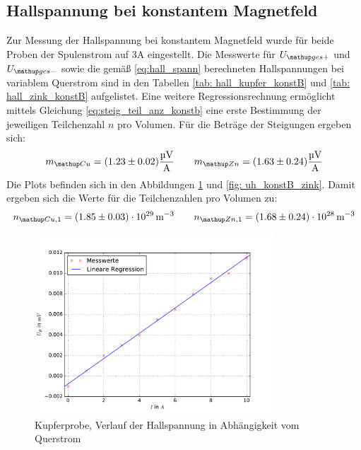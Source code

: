 \subsection{Hallspannung bei konstantem Magnetfeld}
Zur Messung der Hallspannung bei konstantem Magnetfeld wurde für beide Proben der Spulenstrom auf $3\si{\ampere}$ eingestellt. Die %
Messwerte für $U\ua{ges+}$ und $U\ua{ges-}$ sowie die gemäß \eqref{eq:hall_spann} berechneten Hallspannungen bei variablem Querstrom sind in den %
Tabellen \ref{tab: hall_kupfer_konstB} und \ref{tab: hall_zink_konstB} aufgelistet. Eine weitere Regressionsrechnung ermöglicht mittels Gleichung \eqref{eq:steig_teil_anz_konstb} eine
erste Bestimmung der jeweiligen Teilchenzahl $n$ pro Volumen. Für die Beträge der Steigungen ergeben sich: %
\begin{equation}
  m\ua{Cu} = (1.23 \pm 0.02)\si{\micro \volt \per \ampere}  \quad \quad m\ua{Zn} = (1.63 \pm 0.24)\si{\micro \volt \per \ampere}%
\end{equation}
Die Plots befinden sich in den Abbildungen \ref{fig: uh_konstB_kupfer} und \ref{fig: uh_konstB_zink}.
Damit ergeben sich die Werte für die Teilchenzahlen pro Volumen zu:
\begin{equation}
  n\ua{Cu,1} = (1.85 \pm 0.03)\cdot 10^{29}\,\si{ \meter^{-3}} \quad \quad n\ua{Zn,1} = (1.68\pm 0.24)\cdot 10^{28}\,\si{ \meter^{-3}}%
\end{equation}
\begin{figure}
  \centering
  \includegraphics[width=0.8\textwidth]{pics/u_h_kupfer_konstB.pdf}
  \caption{Kupferprobe, Verlauf der Hallspannung in Abhängigkeit vom Querstrom}
  \label{fig: uh_konstB_kupfer}
\end{figure}
